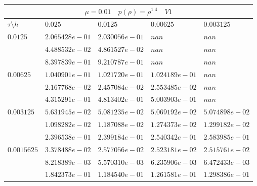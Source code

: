 \documentclass[a4paper,12pt]{extarticle}
\begin{document}
\begin{tabular}{|l|l|l|l|l|}
	\hline
	\multicolumn{5}{|c|}{$\mu =0.01 \quad  p(\rho) = \rho^{1.4} \quad V1$}\\
	\hline
	$\tau\setminus h$ & $0.025$ & $0.0125$ & $0.00625$ & $0.003125$\\
	\hline
	$0.0125$  & $2.065428e-01$ & $2.030056e-01$ & $nan$ & $nan$\\
	& $4.488532e-02$ & $4.861527e-02$ & $nan$ & $nan$\\
	& $8.397839e-01$ & $9.210787e-01$ & $nan$ & $nan$\\
	\hline
	$0.00625$  & $1.040901e-01$ & $1.021720e-01$ & $1.024189e-01$ & $nan$\\
	& $2.167768e-02$ & $2.457084e-02$ & $2.553485e-02$ & $nan$\\
	& $4.315291e-01$ & $4.813402e-01$ & $5.003903e-01$ & $nan$\\
	\hline
	$0.003125$  & $5.631945e-02$ & $5.081235e-02$ & $5.069192e-02$ & $5.074898e-02$\\
	& $1.098282e-02$ & $1.187088e-02$ & $1.274373e-02$ & $1.299182e-02$\\
	& $2.396538e-01$ & $2.399184e-01$ & $2.540342e-01$ & $2.583985e-01$\\
	\hline
	$0.0015625$  & $3.378488e-02$ & $2.577056e-02$ & $2.523181e-02$ & $2.515761e-02$\\
	& $8.218389e-03$ & $5.570310e-03$ & $6.235906e-03$ & $6.472433e-03$\\
	& $1.842373e-01$ & $1.184540e-01$ & $1.261581e-01$ & $1.298386e-01$\\
	\hline
\end{tabular}
\end{document}
